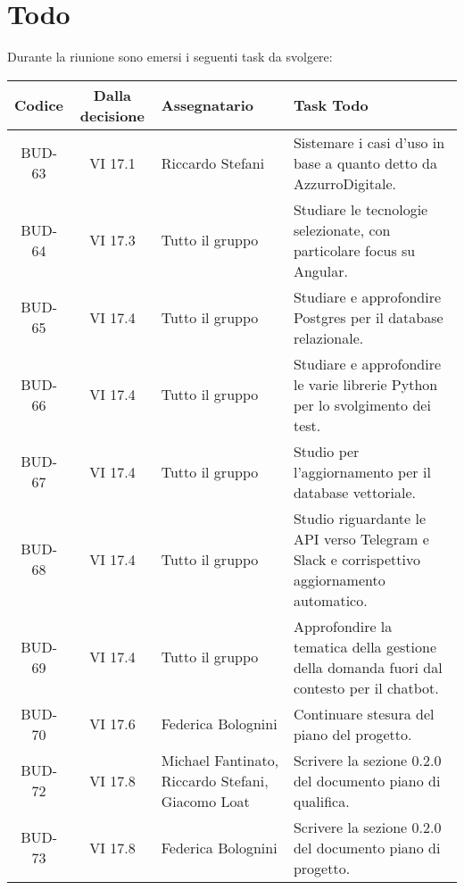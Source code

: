 
\section{Todo}

Durante la riunione sono emersi i seguenti task da svolgere:

\vspace{0.5cm}

\begin{table}[htbp]
\centering
{}
\begin{tabular}{|c|c|p{}|p{}|}
    \hline
    \rowcolor[gray]{0.75}
    \textbf{Codice} & \textbf{Dalla decisione} & \textbf{Assegnatario} & \textbf{Task Todo} \\
    \hline
    BUD-63 & VI 17.1 & Riccardo Stefani & Sistemare i casi d'uso in base a quanto detto da AzzurroDigitale. \\
    \hline
    BUD-64 & VI 17.3 & Tutto il gruppo & Studiare le tecnologie selezionate, con particolare focus su Angular. \\
    \hline
    BUD-65 & VI 17.4 & Tutto il gruppo & Studiare e approfondire Postgres per il database relazionale. \\
    \hline
    BUD-66 & VI 17.4 & Tutto il gruppo & Studiare e approfondire le varie librerie Python per lo svolgimento dei test. \\
    \hline
    BUD-67 & VI 17.4 & Tutto il gruppo & Studio per l'aggiornamento per il database vettoriale. \\
    \hline
    BUD-68 & VI 17.4 & Tutto il gruppo & Studio riguardante le API verso Telegram e Slack e corrispettivo aggiornamento automatico. \\
    \hline
    BUD-69 & VI 17.4 & Tutto il gruppo & Approfondire la tematica della gestione della domanda fuori dal contesto per il chatbot. \\
    \hline
    BUD-70 & VI 17.6 & Federica Bolognini & Continuare stesura del piano del progetto. \\
    \hline
    BUD-72 & VI 17.8 & Michael Fantinato, Riccardo Stefani, Giacomo Loat & Scrivere la sezione 0.2.0 del documento piano di qualifica. \\
    \hline
    BUD-73 & VI 17.8 & Federica Bolognini& Scrivere la sezione 0.2.0 del documento piano di progetto. \\

\end{tabular}
\end{table}
